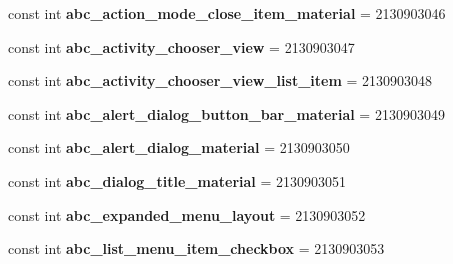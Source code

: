 \begin{DoxyCompactItemize}
\item 
\mbox{\label{class_sample_app_1_1_droid_1_1_resource_1_1_layout_aeb507dcd42ebbd6841a94322a841f3d8}} 
const int {\bfseries abc\+\_\+action\+\_\+mode\+\_\+close\+\_\+item\+\_\+material} = 2130903046
\item 
\mbox{\label{class_sample_app_1_1_droid_1_1_resource_1_1_layout_a76f06c5ab01353794cfb47044f5657fd}} 
const int {\bfseries abc\+\_\+activity\+\_\+chooser\+\_\+view} = 2130903047
\item 
\mbox{\label{class_sample_app_1_1_droid_1_1_resource_1_1_layout_a7d0312a79c665f7b4b0c3019f3dcc8c4}} 
const int {\bfseries abc\+\_\+activity\+\_\+chooser\+\_\+view\+\_\+list\+\_\+item} = 2130903048
\item 
\mbox{\label{class_sample_app_1_1_droid_1_1_resource_1_1_layout_a48afde4402476cc306bb5e9440677e26}} 
const int {\bfseries abc\+\_\+alert\+\_\+dialog\+\_\+button\+\_\+bar\+\_\+material} = 2130903049
\item 
\mbox{\label{class_sample_app_1_1_droid_1_1_resource_1_1_layout_aba70b44568db8cabfdf95a5657b5bd4b}} 
const int {\bfseries abc\+\_\+alert\+\_\+dialog\+\_\+material} = 2130903050
\item 
\mbox{\label{class_sample_app_1_1_droid_1_1_resource_1_1_layout_a15ad997e059a0f0b1a226ecd943ba2ad}} 
const int {\bfseries abc\+\_\+dialog\+\_\+title\+\_\+material} = 2130903051
\item 
\mbox{\label{class_sample_app_1_1_droid_1_1_resource_1_1_layout_af5fb3c4676858fa75011e6e148f0087a}} 
const int {\bfseries abc\+\_\+expanded\+\_\+menu\+\_\+layout} = 2130903052
\item 
\mbox{\label{class_sample_app_1_1_droid_1_1_resource_1_1_layout_a1055043179c9804d4677bc8ed3a7a197}} 
const int {\bfseries abc\+\_\+list\+\_\+menu\+\_\+item\+\_\+checkbox} = 2130903053

\end{DoxyCompactItemize}
